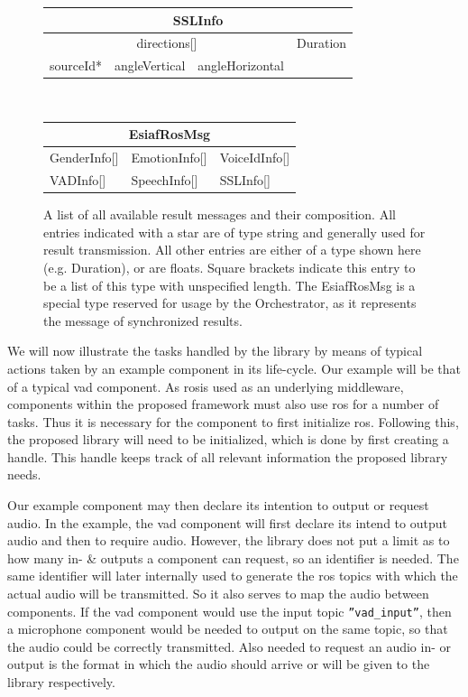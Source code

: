 \begin{figure}[]
	\begin{tabular}{| l | l | l | l|}
		\hline
		
		\multicolumn{4}{|c|}{\textbf{SSLInfo}} \\ \hline
		\multicolumn{3}{|c|}{directions[]} & Duration  \\\cline{1-3}
		sourceId* & angleVertical & angleHorizontal & \\\hline
	\end{tabular}\\\vspace{0.3cm}
	
	\begin{tabular}{| l | l | l |}
		\hline
		
		\multicolumn{3}{|c|}{\textbf{EsiafRosMsg}} \\ \hline
		GenderInfo[]	& EmotionInfo[]	& VoiceIdInfo[]	\\\hline
		VADInfo[]	& SpeechInfo[]	& SSLInfo[] \\\hline
	\end{tabular}
	\caption{A list of all available result messages and their composition.
		All entries indicated with a star are of type string and generally used for result transmission.
		All other entries are either of a type shown here (e.g. Duration), or are floats.
		Square brackets indicate this entry to be a list of this type with unspecified length.
		The EsiafRosMsg is a special type reserved for usage by the Orchestrator, as it represents the message of synchronized results.
		}
	\label{table:main:lib:messages}
\end{figure}


We will now illustrate the tasks handled by the library by means of typical actions taken by an example component in its life-cycle.
Our example will be that of a typical \gls{vad} component.
As \gls{ros}is used as an underlying middleware, components within the proposed framework must also use \gls{ros} for a number of tasks.
Thus it is necessary for the component to first initialize \gls{ros}.
Following this, the proposed library will need to be initialized, which is done by first creating a handle.
This handle keeps track of all relevant information the proposed library needs.

Our example component may then declare its intention to output or request audio.
In the example, the \gls{vad} component will first declare its intend to output audio and then to require audio.
However, the library does not put a limit as to how many in- \& outputs a component can request, so an identifier is needed.
The same identifier will later internally used to generate the \gls{ros} topics with which the actual audio will be transmitted.
So it also serves to map the audio between components.%
If the \gls{vad} component would use the input topic \texttt{''vad\_input''}, then a microphone component would be needed to output on the same topic, so that the audio could be correctly transmitted.
Also needed to request an audio in- or output is the format in which the audio should arrive or will be given to the library respectively.

